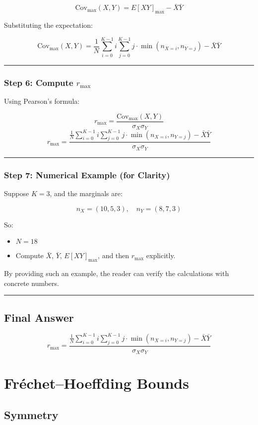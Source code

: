 \documentclass[
  12pt,
  letterpaper,
  DIV=11,
  numbers=noendperiod]{scrartcl}
\providecommand{\tightlist}{%
  \setlength{\itemsep}{0pt}\setlength{\parskip}{0pt}}\usepackage{longtable,booktabs,array}
\begin{document}
\[\text{Cov}_{\max}(X,Y) = E[XY]_{\max} - \bar{X} \bar{Y}\]

Substituting the expectation:

\[\text{Cov}_{\max}(X,Y) = \frac{1}{N} \sum_{i=0}^{K-1} i \sum_{j=0}^{K-1} j \cdot \min(n_{X=i}, n_{Y=j}) - \bar{X} \bar{Y}\]

\begin{center}\rule{0.5\linewidth}{0.5pt}\end{center}

\subsubsection{\texorpdfstring{\textbf{Step 6: Compute
\(r_{\max}\)}}{Step 6: Compute r\_\{\textbackslash max\}}}\label{step-6-compute-r_max-1}

Using Pearson's formula:

\[r_{\max} = \frac{\text{Cov}_{\max}(X, Y)}{\sigma_X \sigma_Y}\]
\[r_{\max} =  
\frac{\frac{1}{N} \sum_{i=0}^{K-1} i \sum_{j=0}^{K-1} j \cdot \min(n_{X=i}, n_{Y=j}) - \bar{X} \bar{Y}}  
{\sigma_X \sigma_Y}\]

\begin{center}\rule{0.5\linewidth}{0.5pt}\end{center}

\subsubsection{\texorpdfstring{\textbf{Step 7: Numerical Example (for
Clarity)}}{Step 7: Numerical Example (for Clarity)}}\label{step-7-numerical-example-for-clarity}

Suppose \(K=3\), and the marginals are:

\[n_X = (10, 5, 3), \quad n_Y = (8, 7, 3)\]

So:

\begin{itemize}
\tightlist
\item
  \(N = 18\)
\item
  Compute \(\bar{X}\), \(\bar{Y}\), \(E[XY]_{\max}\), and then
  \(r_{\max}\) explicitly.
\end{itemize}

By providing such an example, the reader can verify the calculations
with concrete numbers.

\begin{center}\rule{0.5\linewidth}{0.5pt}\end{center}

\subsection{\texorpdfstring{\textbf{Final
Answer}}{Final Answer}}\label{final-answer-1}

\[r_{\max} =  
\frac{\frac{1}{N} \sum_{i=0}^{K-1} i \sum_{j=0}^{K-1} j \cdot \min(n_{X=i}, n_{Y=j}) - \bar{X} \bar{Y}}  
{\sigma_X \sigma_Y}\]

\section{Fréchet--Hoeffding Bounds}\label{fruxe9chethoeffding-bounds}

\subsection{Symmetry}\label{symmetry}
\end{document}

